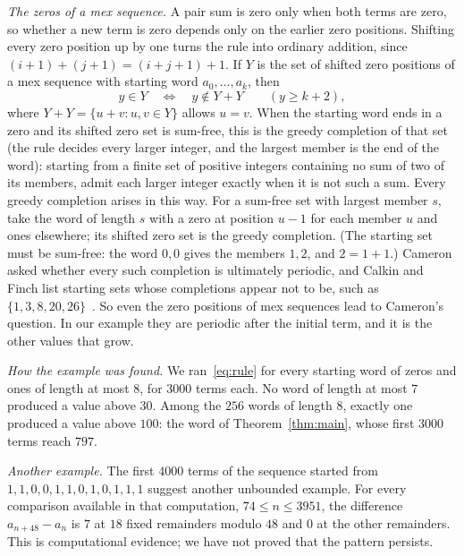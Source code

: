 \documentclass[11pt]{amsart}
\theoremstyle{remark}
\begin{document}
\emph{The zeros of a mex sequence.} A pair sum is zero only when both terms are zero, so whether a new term is zero depends only on the earlier zero positions. Shifting every zero position up by one turns the rule into ordinary addition, since $(i+1)+(j+1)=(i+j+1)+1$. If $Y$ is the set of shifted zero positions of a mex sequence with starting word $a_0,\ldots,a_k$, then
\[
 y\in Y\quad\Longleftrightarrow\quad y\notin Y+Y\qquad(y\ge k+2),
\]
where $Y+Y=\{u+v:u,v\in Y\}$ allows $u=v$. When the starting word ends in a zero and its shifted zero set is sum-free, this is the greedy completion of that set (the rule decides every larger integer, and the largest member is the end of the word): starting from a finite set of positive integers containing no sum of two of its members, admit each larger integer exactly when it is not such a sum. Every greedy completion arises in this way. For a sum-free set with largest member $s$, take the word of length $s$ with a zero at position $u-1$ for each member $u$ and ones elsewhere; its shifted zero set is the greedy completion. (The starting set must be sum-free: the word $0,0$ gives the members $1,2$, and $2=1+1$.) Cameron asked whether every such completion is ultimately periodic, and Calkin and Finch list starting sets whose completions appear not to be, such as $\{1,3,8,20,26\}$~\cite{CF}. So even the zero positions of mex sequences lead to Cameron's question. In our example they are periodic after the initial term, and it is the other values that grow.

\emph{How the example was found.} We ran~\eqref{eq:rule} for every starting word of zeros and ones of length at most $8$, for $3000$ terms each. No word of length at most $7$ produced a value above $30$. Among the $256$ words of length $8$, exactly one produced a value above $100$: the word of Theorem~\ref{thm:main}, whose first $3000$ terms reach $797$.

\emph{Another example.} The first $4000$ terms of the sequence started from $1,1,0,0,1,1,0,1,0,1,1,1$ suggest another unbounded example. For every comparison available in that computation, $74\le n\le3951$, the difference $a_{n+48}-a_n$ is $7$ at $18$ fixed remainders modulo $48$ and $0$ at the other remainders. This is computational evidence; we have not proved that the pattern persists.
\end{document}

